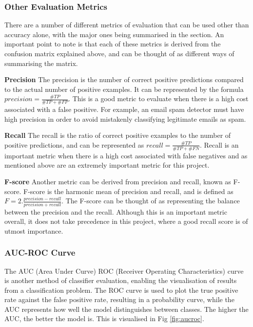 \documentclass[12pt]{report}
\begin{document}
\subsubsection{Other Evaluation Metrics}
\begin{flushleft}
There are a number of different metrics of evaluation that can be used other than accuracy alone, with the major ones being summarised in the section. An important point to note is that each of these metrics is derived from the confusion matrix explained above, and can be thought of as different ways of summarising the matrix.

\vspace{0.5cm}
\textbf{Precision}
\linebreak
The precision is the number of correct positive predictions compared to the actual number of positive examples. It can be represented by the formula $precision = \frac{\#TP}{\#TP + \#FP}$. This is a good metric to evaluate when there is a high cost associated with a false positive. For example, an email spam detector must have high precision in order to avoid mistakenly classifying legitimate emails as spam. 

\vspace{0.5cm}
\textbf{Recall}
\linebreak
The recall is the ratio of correct positive examples to the number of positive predictions, and can be represented as $recall = \frac{\#TP}{\#TP + \#FN}$. Recall is an important metric when there is a high cost associated with false negatives and as mentioned above are an extremely important metric for this project.

\vspace{0.5cm}
\textbf{F-score}
\linebreak
Another metric can be derived from precision and recall, known as F-score. F-score is the harmonic mean of precision and recall, and is defined as 
$F = 2. \frac{precision - recall}{precision + recall}$. The F-score can be thought of as representing the balance between the precision and the recall. Although this is an important metric overall, it does not take precedence in this project, where a good recall score is of utmost importance.
\end{flushleft}

\subsubsection{AUC-ROC Curve}
\begin{flushleft}
The AUC (Area Under Curve) ROC (Receiver Operating Characteristics) curve is another method of classifier evaluation, enabling the visualisation of results from a classification problem. The ROC curve is used to plot the true positive rate against the false positive rate, resulting in a probability curve, while the AUC represents how well the model distinguishes between classes. The higher the AUC, the better the model is. This is visualised in Fig \ref{fig:aucroc}.
\end{flushleft}
\end{document}

